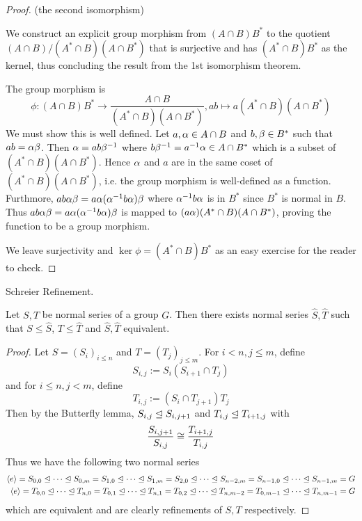 \documentclass[../../book.tex]{subfiles}
\begin{document}
\begin{proof}
    (the second isomorphism)
    
    We construct an explicit group morphism 
    from $(A \cap B)B^*$ to the quotient $(A \cap B) / (A^* \cap B)(A \cap B^*)$
    that is surjective and has $(A^* \cap B)B^*$ as the kernel,
    thus concluding the result from the 1st isomorphism theorem. 
    
    The group morphism is \[
        \phi : (A \cap B)B^* \to \frac{A \cap B}{(A^* \cap B)(A \cap B^*)},
        a b \mapsto a (A^* \cap B)(A \cap B^*)
    \]
    We must show this is well defined.
    Let $a, \alpha \in A \cap B$ and $b, \beta \in B^*$ such that $ab = \alpha \beta$. 
    Then $\alpha = a b \beta^{-1}$ where $b \beta^{-1} = a^{-1} \alpha \in A \cap B^*$
    which is a subset of $(A^* \cap B)(A \cap B^*)$.
    Hence $\alpha$ and $a$ are in the same coset of $(A^* \cap B)(A \cap B^*)$,
    i.e. the group morphism is well-defined as a function. 
    Furthmore, $a b \alpha \beta = a \alpha (\alpha^{-1} b \alpha) \beta$ 
    where $\alpha^{-1} b \alpha$ is in $B^*$ since $B^*$ is normal in $B$.
    Thus $a b \alpha \beta = a \alpha (\alpha^{-1} b \alpha) \beta$ is mapped to 
    $(a \alpha)(A^* \cap B)(A \cap B^*)$,
    proving the function to be a group morphism. 
    
    We leave surjectivity and $\ker \phi = (A^* \cap B) B^*$ 
    as an easy exercise for the reader to check. 
    
\end{proof}

\begin{thm} Schreier Refinement. 
    
    Let $S, T$ be normal series of a group $G$. 
    Then there exists normal series $\hat{S}, \hat{T}$ such that
    $S \leq \hat{S}$, $T \leq \hat{T}$ and $\hat{S}, \hat{T}$ equivalent. 
    
\end{thm}
\begin{proof}
    
    Let $S = (S_i)_{i \leq n}$ and $T = (T_j)_{j \leq m}$. 
    For $i < n, j \leq m$, define \[
        S_{i,j} := S_i (S_{i+1} \cap T_j)
    \]
    and for $i \leq n, j < m$, define \[
        T_{i,j} := (S_{i} \cap T_{j+1}) T_j
    \]
    Then by the Butterfly lemma, 
    $S_{i,j} \trianglelefteq S_{i,j+1}$ and $T_{i,j} \trianglelefteq T_{i+1,j}$
    with \[
        \frac{S_{i,j+1}}{S_{i,j}} \cong \frac{T_{i+1,j}}{T_{i,j}}
    \]
    Thus we have the following two normal series \begin{align*}
        \langle e\rangle = S_{0,0} \trianglelefteq \cdots \trianglelefteq S_{0,m} 
        = S_{1,0} \trianglelefteq \cdots \trianglelefteq S_{1,m}
        = S_{2,0} \trianglelefteq \cdots \trianglelefteq S_{n-2,m}
        = S_{n-1,0} \trianglelefteq \cdots \trianglelefteq S_{n-1,m} = G
        \\
        \langle e\rangle = T_{0,0} \trianglelefteq \cdots \trianglelefteq T_{n,0} 
        = T_{0,1} \trianglelefteq \cdots \trianglelefteq T_{n,1} 
        = T_{0,2}\trianglelefteq \cdots \trianglelefteq T_{n,m-2}
        = T_{0,m-1} \trianglelefteq \cdots \trianglelefteq T_{n,m-1} = G
    \end{align*}
    which are equivalent and are clearly refinements of $S, T$ respectively. 
    
\end{proof}
\end{document}
